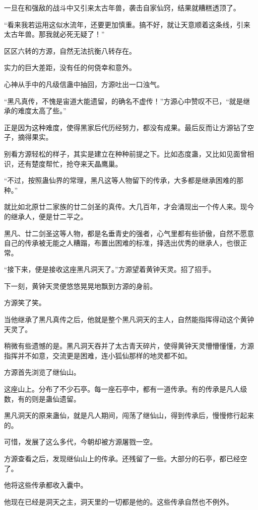 \begin{this_body}
一旦在和强敌的战斗中又引来太古年兽，袭击自家仙窍，结果就糟糕透顶了。

“看来我若运用这似水流年，还要更加慎重。搞不好，就让天意顺着这条线，引来太古年兽。那我就必死无疑了！”

区区六转的方源，自然无法抗衡八转存在。

实力的巨大差距，没有任的何侥幸和意外。

心神从手中的凡级信蛊中抽回，方源吐出一口浊气。

“黑凡真传，不愧是宙道大能遗留，的确名不虚传！”方源心中赞叹不已，“就是继承的难度太高了些。”

正是因为这种难度，使得黑家后代历经努力，都没有成果。最后反而让方源钻了空子，摘得果实。

别看方源轻松的样子，其实是建立在种种前提之下。比如态度蛊，又比如见面曾相识，还有楚度帮忙，抢夺来天晶鹰巢。

“不过，按照蛊仙界的常理，黑凡这等人物留下的传承，大多都是继承困难的那种。”

就比如北原廿二家族的廿二剑圣的真传。大几百年，才会涌现出一个传人来。现今的继承人，便是廿二平之。

黑凡、廿二剑圣这等人物，都是名垂青史的强者，心气里都有些骄傲，自然不愿意自己的传承被无能之人糟蹋，布置出困难的标准，择选出优秀的继承人，也很正常。

“接下来，便是接收这座黑凡洞天了。”方源望着黄钟天灵。招了招手。

下一刻，黄钟天灵便悠悠晃晃地飘到方源的身前。

方源笑了笑。

当他继承了黑凡真传之后，他就是整个黑凡洞天的主人，自然能指挥得动这个黄钟天灵了。

稍微有些遗憾的是。黑凡洞天吞并了太古青天碎片，使得黄钟天灵懵懵懂懂，方源指挥并不如意，交流更是困难，连小狐仙那样的地灵都不如。

方源首先浏览了继仙山。

这座山上。分布了不少石亭。每一座石亭中，都有一道传承。有的传承是凡人级数，有的则是蛊仙遗留。

黑凡洞天的原来蛊仙，就是凡人期间，闯荡了继仙山，得到传承后，慢慢修行起来的。

可惜，发展了这么多代，今朝却被方源屠戮一空。

方源查看之后，发现继仙山上的传承。还残留了一些。大部分的石亭，都已经空了。

他将这些传承都收入囊中。

他现在已经是洞天之主，洞天里的一切都是他的。这些传承自然也不例外。


\end{this_body}
